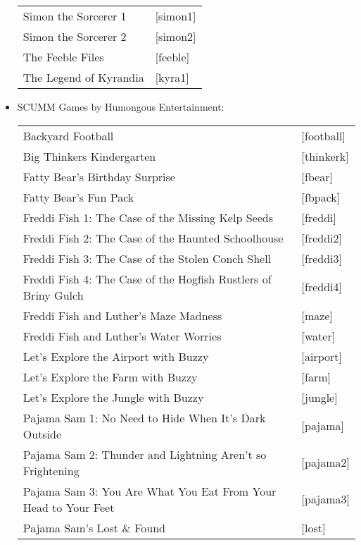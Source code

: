 \begin{itemize}
\begin{tabular}[h]{ll}
    Simon the Sorcerer 1&                          [simon1]\\
    Simon the Sorcerer 2&                          [simon2]\\
    The Feeble Files&                              [feeble]\\
    The Legend of Kyrandia&                        [kyra1]\\
  \end{tabular}
\item SCUMM Games by Humongous Entertainment:\\
  \begin{tabular}[h]{ll}
    Backyard Football&                             [football]\\
    Big Thinkers Kindergarten&                     [thinkerk]\\
    Fatty Bear's Birthday Surprise&                [fbear]\\
    Fatty Bear's Fun Pack&                         [fbpack]\\
    Freddi Fish 1: The Case of the Missing
        Kelp Seeds&                                [freddi]\\
    Freddi Fish 2: The Case of the Haunted
        Schoolhouse&                               [freddi2]\\
    Freddi Fish 3: The Case of the Stolen
        Conch Shell&                               [freddi3]\\
    Freddi Fish 4: The Case of the Hogfish
        Rustlers of Briny Gulch&                   [freddi4]\\
    Freddi Fish and Luther's Maze Madness&         [maze]\\
    Freddi Fish and Luther's Water Worries&        [water]\\
    Let's Explore the Airport with Buzzy&          [airport]\\
    Let's Explore the Farm with Buzzy&             [farm]\\
    Let's Explore the Jungle with Buzzy&           [jungle]\\
    Pajama Sam 1: No Need to Hide When It's
        Dark Outside&                              [pajama]\\
    Pajama Sam 2: Thunder and Lightning
        Aren't so Frightening&                     [pajama2]\\
    Pajama Sam 3: You Are What You Eat
        From Your Head to Your Feet&               [pajama3]\\
    Pajama Sam's Lost \& Found&                    [lost]\\

\end{tabular}
\end{itemize}
